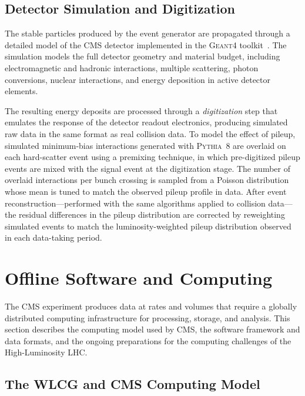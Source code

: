 \subsection*{Detector Simulation and Digitization}
\label{sec:mc_detsim}

The stable particles produced by the event generator are propagated through a detailed model of the CMS detector implemented in the \textsc{Geant4} toolkit~\cite{GEANT4:2002zbu, Allison:2016lfl}. The simulation models the full detector geometry and material budget, including electromagnetic and hadronic interactions, multiple scattering, photon conversions, nuclear interactions, and energy deposition in active detector elements.

The resulting energy deposits are processed through a \textit{digitization} step that emulates the response of the detector readout electronics, producing simulated raw data in the same format as real collision data. To model the effect of pileup, simulated minimum-bias interactions generated with \textsc{Pythia}~8 are overlaid on each hard-scatter event using a premixing technique, in which pre-digitized pileup events are mixed with the signal event at the digitization stage. The number of overlaid interactions per bunch crossing is sampled from a Poisson distribution whose mean is tuned to match the observed pileup profile in data. After event reconstruction---performed with the same algorithms applied to collision data---the residual differences in the pileup distribution are corrected by reweighting simulated events to match the luminosity-weighted pileup distribution observed in each data-taking period.

\section{Offline Software and Computing}
\label{sec:computing}

The CMS experiment produces data at rates and volumes that require a globally distributed computing infrastructure for processing, storage, and analysis. This section describes the computing model used by CMS, the software framework and data formats, and the ongoing preparations for the computing challenges of the High-Luminosity LHC.

\subsection*{The WLCG and CMS Computing Model}
\label{sec:wlcg}

